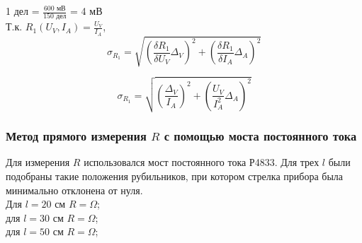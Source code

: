 \documentclass{article}
\begin{document}
	1 дел = $\frac{600 \text{ мВ}}{150 \text{ дел}}$ = 4 мВ\\
	
	Т.к. $R_{1}(U_{V}, I_{A}) = \frac{U_{V}}{I_{A}}$,
	\[\sigma_{R_{1}} = \sqrt{ (\frac{\delta R_{1}}{\delta U_{V}}\Delta_{V})^{2} + (\frac{\delta R_{1}}{\delta I_{A}}\Delta_{A})^{2} }\]
	
	\[\sigma_{R_{1}} = \sqrt{ (\frac{\Delta_{V}}{I_{A}})^{2} + (\frac{U_{V}}{I_{A}^{2}}\Delta_{A})^{2} }\]
	
	\subsubsection{Метод прямого измерения $R$ с помощью моста постоянного тока}
	Для измерения $R$ использовался мост постоянного тока Р4833. Для трех $l$ были подобраны такие положения рубильников, при котором стрелка прибора была минимально отклонена от нуля.\\
	Для $l = 20 \text{ см}$ $R = \Omega$;\\
	для $l = 30 \text{ см}$ $R = \Omega$;\\
	для $l = 50 \text{ см}$ $R = \Omega$;\\
	
	
	
	
\end{document}
